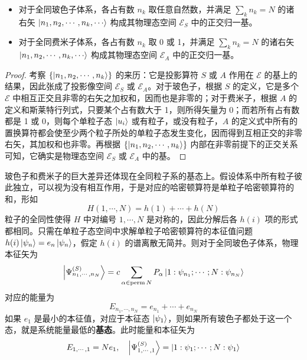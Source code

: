 \documentclass[cn,10pt,math=newtx,citestyle=gb7714-2015,bibstyle=gb7714-2015]{elegantbook}
\def\ms{\mathscr}
\begin{document}
\begin{theorem}[福克态右矢作为正交归一基]
    \begin{itemize}
        \item 对于全同玻色子体系，各占有数 $n_k$ 取任意自然数，并满足 $\sum\limits_k n_k=N$ 的诸右矢 $\ket{n_1,n_2,\cdots,n_k,\cdots}$ 构成其物理态空间 $\ms E_S$ 中的正交归一基。
        \item 对于全同费米子体系，各占有数 $n_k$ 取 0 或 1，并满足 $\sum\limits_k n_k=N$ 的诸右矢 $\ket{n_1,n_2,\cdots,n_k,\cdots}$ 构成其物理态空间 $\ms E_A$ 中的正交归一基。
    \end{itemize}
\end{theorem}
\begin{proof}
    考察 $\{\ket{n_1,n_2,\cdots,n_k}\}$ 的来历：它是投影算符 $S$ 或 $A$ 作用在 $\ms E$ 的基上的结果，因此张成了投影像空间 $\ms E_S$ 或 $\ms E_A$。对于玻色子，根据 $S$ 的定义，它是多个 $\ms E$ 中相互正交且非零的右矢之加权和，因而也是非零的；对于费米子，根据 $A$ 的定义和斯莱特行列式，只要某个占有数大于 1，则所得矢量为 0；而若所有占有数都是 1 或 0，则每个单粒子态 $\ket{u_i}$ 或有粒子，或没有粒子，$A$ 的定义式中所有的置换算符都会使至少两个粒子所处的单粒子态发生变化，因而得到互相正交的非零右矢，其加权和也非零。再根据 $\{\ket{n_1,n_2,\cdots,n_k}\}$ 内部在非零前提下的正交关系可知，它确实是物理态空间 $\ms E_S$ 或 $\ms E_A$ 中的基。
\end{proof}

玻色子和费米子的巨大差异还体现在全同粒子系的基态上。假设体系中所有粒子彼此独立，可以视为没有相互作用，于是对应的哈密顿算符是单粒子哈密顿算符的和，形如
\begin{equation}
    H(1,\cdots,N) = h(1)+\cdots+h(N)
\end{equation}
粒子的全同性使得 $H$ 中对编号 $1,\cdots,N$ 是对称的，因此分解后各 $h(i)$ 项的形式都相同。只需在单粒子态空间中求解单粒子哈密顿算符的本征值问题 $h(i)\ket{\psi_n} = e_n\ket{\psi_n}$，假定 $h(i)$ 的谱离散无简并。则对于全同玻色子体系，物理本征矢为
\begin{equation}
    \Ket{\Psi_{n_1,\cdots,n_N}^{(S)}} = c\sum_{\alpha\in\text{perm}\,N} P_\alpha\ket{1:\psi_{n_1};\cdots;N:\psi_{n_N}}
\end{equation}
对应的能量为
\begin{equation}
    E_{n_1,\cdots,n_N} = e_{n_1}+\cdots+e_{n_N}
\end{equation}
如果 $e_1$ 是最小的本征值，对应于本征态 $\ket{\psi_1}$，则如果所有玻色子都处于这一个态，就是系统能量最低的\textbf{基态}。此时能量和本征矢为
\begin{equation}
    E_{1,\cdots,1} = Ne_1,\quad\Ket{\Psi_{1,\cdots,1}^{(S)}} = \ket{1:\psi_1;\cdots;N:\psi_1}
\end{equation}
\end{document}
